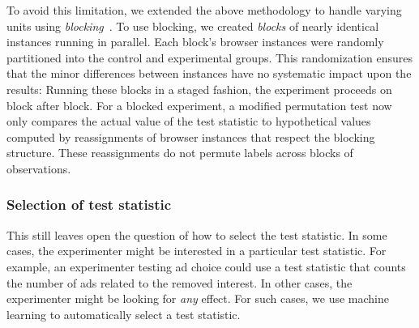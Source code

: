 \documentclass[10pt, onecolumn]{report}
\begin{document}
To avoid this limitation, we extended the above methodology 
to handle varying units using \emph{blocking}~\cite{good05book}.
To use blocking, we created \emph{blocks} of nearly identical instances running in parallel.  
Each block's browser instances were randomly partitioned into the 
control and experimental groups. This randomization ensures that the 
minor differences between instances have no systematic impact upon the results: 
Running these blocks in a staged fashion, the experiment proceeds 
on block after block.  %
For a blocked experiment, a modified permutation test now only 
compares the actual value of the test statistic to hypothetical values 
computed by reassignments of browser instances that respect the blocking structure.  
These reassignments do not permute labels across blocks of observations.

\subsubsection{Selection of test statistic}

This still leaves open the question of how to select the test statistic.  
In some cases, the experimenter might be interested in a particular test statistic. 
For example, an experimenter testing ad choice could use a test statistic that 
counts the number of ads related to the removed interest.
In other cases, the experimenter might be looking for \emph{any} effect.  
For such cases, we use machine learning to automatically select a test statistic. 
\end{document}
